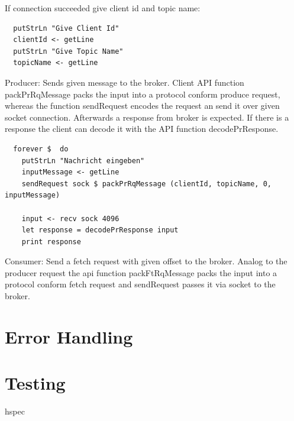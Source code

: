 If connection succeeded give client id and topic name: 
\begin{lstlisting}
  putStrLn "Give Client Id"
  clientId <- getLine
  putStrLn "Give Topic Name"
  topicName <- getLine
\end{lstlisting}

Producer: Sends given message to the broker. Client API function packPrRqMessage
packs the input into a protocol conform produce request, whereas the function
sendRequest encodes the request an send it over given socket connection.
Afterwards a response from broker is expected. If there is a response the client
can decode it with the API function decodePrResponse. 
\begin{lstlisting}
  forever $  do 
    putStrLn "Nachricht eingeben"
    inputMessage <- getLine
    sendRequest sock $ packPrRqMessage (clientId, topicName, 0, inputMessage)

    input <- recv sock 4096
    let response = decodePrResponse input
    print response 
\end{lstlisting}

Consumer: Send a fetch request with given offset to the broker. Analog to the producer request 
the api function packFtRqMessage packs the input into a protocol conform fetch request and sendRequest passes it via socket to the broker. 
\section{Error
Handling}

\section{Testing}
hspec 


